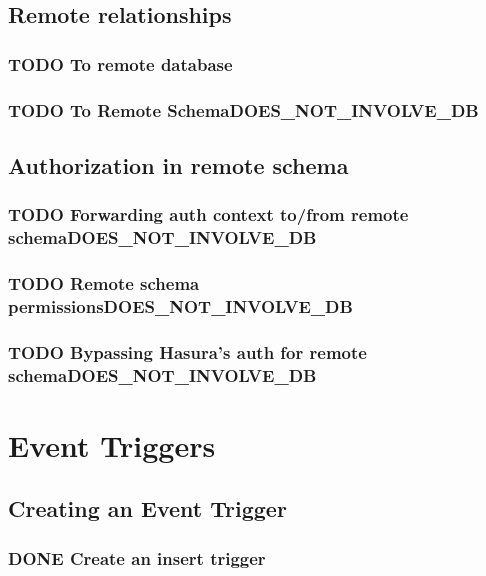 \documentclass[11pt]{article}
\begin{document}
\subsection{Remote relationships}
\label{sec:org4b7d9a4}
\subsubsection{{\bfseries\sffamily TODO} To remote database}
\label{sec:orge2d9779}
\subsubsection{{\bfseries\sffamily TODO} To Remote Schema\hfill{}\textsc{DOES\_NOT\_INVOLVE\_DB}}
\label{sec:orge84f2bd}
\subsection{Authorization in remote schema}
\label{sec:org80bd00d}
\subsubsection{{\bfseries\sffamily TODO} Forwarding auth context to/from remote schema\hfill{}\textsc{DOES\_NOT\_INVOLVE\_DB}}
\label{sec:orgacc8bd4}
\subsubsection{{\bfseries\sffamily TODO} Remote schema permissions\hfill{}\textsc{DOES\_NOT\_INVOLVE\_DB}}
\label{sec:org26b3f49}
\subsubsection{{\bfseries\sffamily TODO} Bypassing Hasura's auth for remote schema\hfill{}\textsc{DOES\_NOT\_INVOLVE\_DB}}
\label{sec:org9c2f86c}
\section{Event Triggers}
\label{sec:org2444bb0}
\subsection{Creating an Event Trigger}
\label{sec:orgc887d64}
\subsubsection{{\bfseries\sffamily DONE} Create an insert trigger}
\label{sec:org9528673}
\end{document}
